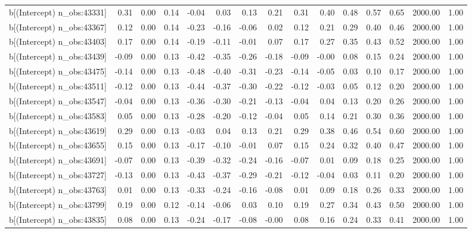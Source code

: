 \begin{table}[ht]
\begin{tabular}{rrrrrrrrrrrrrrr}
  b[(Intercept) n\_obs:43331] & 0.31 & 0.00 & 0.14 & -0.04 & 0.03 & 0.13 & 0.21 & 0.31 & 0.40 & 0.48 & 0.57 & 0.65 & 2000.00 & 1.00 \\ 
  b[(Intercept) n\_obs:43367] & 0.12 & 0.00 & 0.14 & -0.23 & -0.16 & -0.06 & 0.02 & 0.12 & 0.21 & 0.29 & 0.40 & 0.46 & 2000.00 & 1.00 \\ 
  b[(Intercept) n\_obs:43403] & 0.17 & 0.00 & 0.14 & -0.19 & -0.11 & -0.01 & 0.07 & 0.17 & 0.27 & 0.35 & 0.43 & 0.52 & 2000.00 & 1.00 \\ 
  b[(Intercept) n\_obs:43439] & -0.09 & 0.00 & 0.13 & -0.42 & -0.35 & -0.26 & -0.18 & -0.09 & -0.00 & 0.08 & 0.15 & 0.24 & 2000.00 & 1.00 \\ 
  b[(Intercept) n\_obs:43475] & -0.14 & 0.00 & 0.13 & -0.48 & -0.40 & -0.31 & -0.23 & -0.14 & -0.05 & 0.03 & 0.10 & 0.17 & 2000.00 & 1.00 \\ 
  b[(Intercept) n\_obs:43511] & -0.12 & 0.00 & 0.13 & -0.44 & -0.37 & -0.30 & -0.22 & -0.12 & -0.03 & 0.05 & 0.12 & 0.20 & 2000.00 & 1.00 \\ 
  b[(Intercept) n\_obs:43547] & -0.04 & 0.00 & 0.13 & -0.36 & -0.30 & -0.21 & -0.13 & -0.04 & 0.04 & 0.13 & 0.20 & 0.26 & 2000.00 & 1.00 \\ 
  b[(Intercept) n\_obs:43583] & 0.05 & 0.00 & 0.13 & -0.28 & -0.20 & -0.12 & -0.04 & 0.05 & 0.14 & 0.21 & 0.30 & 0.36 & 2000.00 & 1.00 \\ 
  b[(Intercept) n\_obs:43619] & 0.29 & 0.00 & 0.13 & -0.03 & 0.04 & 0.13 & 0.21 & 0.29 & 0.38 & 0.46 & 0.54 & 0.60 & 2000.00 & 1.00 \\ 
  b[(Intercept) n\_obs:43655] & 0.15 & 0.00 & 0.13 & -0.17 & -0.10 & -0.01 & 0.07 & 0.15 & 0.24 & 0.32 & 0.40 & 0.47 & 2000.00 & 1.00 \\ 
  b[(Intercept) n\_obs:43691] & -0.07 & 0.00 & 0.13 & -0.39 & -0.32 & -0.24 & -0.16 & -0.07 & 0.01 & 0.09 & 0.18 & 0.25 & 2000.00 & 1.00 \\ 
  b[(Intercept) n\_obs:43727] & -0.13 & 0.00 & 0.13 & -0.43 & -0.37 & -0.29 & -0.21 & -0.12 & -0.04 & 0.03 & 0.11 & 0.20 & 2000.00 & 1.00 \\ 
  b[(Intercept) n\_obs:43763] & 0.01 & 0.00 & 0.13 & -0.33 & -0.24 & -0.16 & -0.08 & 0.01 & 0.09 & 0.18 & 0.26 & 0.33 & 2000.00 & 1.00 \\ 
  b[(Intercept) n\_obs:43799] & 0.19 & 0.00 & 0.12 & -0.14 & -0.06 & 0.03 & 0.10 & 0.19 & 0.27 & 0.34 & 0.43 & 0.50 & 2000.00 & 1.00 \\ 
  b[(Intercept) n\_obs:43835] & 0.08 & 0.00 & 0.13 & -0.24 & -0.17 & -0.08 & -0.00 & 0.08 & 0.16 & 0.24 & 0.33 & 0.41 & 2000.00 & 1.00 \\ 

\end{tabular}
\end{table}
